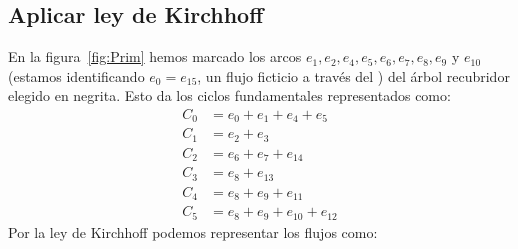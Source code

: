 \subsection{Aplicar ley de Kirchhoff}
\label{sec:aplicar-Kirchhoff}

  En la figura~\ref{fig:Prim} hemos marcado los arcos
  \(e_1, e_2, e_4, e_5, e_6, e_7, e_8, e_9\) y \(e_{10}\)
  (estamos identificando \(e_0 = e_{15}\),
   un flujo ficticio a través del )
  del árbol recubridor elegido en negrita.
  Esto da los ciclos fundamentales representados como:
  \begin{align*}
    C_0
      &= e_0 + e_1 + e_4 + e_5 \\
    C_1
      &= e_2 + e_3 \\
    C_2
      &= e_6 + e_7 + e_{14} \\
    C_3
      &= e_8 + e_{13} \\
    C_4
      &= e_8 + e_9 + e_{11} \\
    C_5
      &= e_8 + e_9 + e_{10} + e_{12}
  \end{align*}
  Por la ley de Kirchhoff podemos representar los flujos como:
